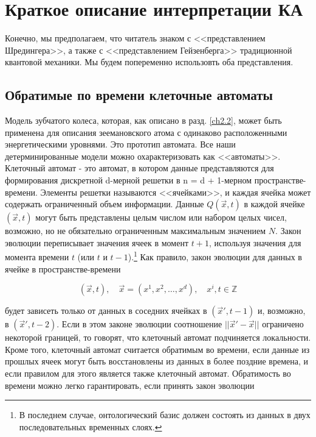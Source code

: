 \documentclass[main.tex]{subfiles}
\begin{document}
\section{Краткое описание интерпретации КА}\label{ch5}

Конечно, мы предполагаем, что читатель знаком с <<представлением Шредингера>>, а также с <<представлением Гейзенберга>> традиционной квантовой механики. Мы будем попеременно использовть оба представления.

\subsection{Обратимые по времени клеточные автоматы }\label{ch5.1}

Модель зубчатого колеса, которая, как описано в разд. \ref{ch2.2}, может быть применена для описания зеемановского атома с одинаково расположенными энергетическими уровнями. Это прототип автомата. Все наши детерминированные модели можно охарактеризовать как <<автоматы>>. Клеточный автомат - это автомат, в котором данные представляются для формирования дискретной d-мерной решетки в n = d + 1-мерном пространстве-времени. Элементы решетки называются <<ячейками>>, и каждая ячейка может содержать ограниченный объем информации. Данные $Q (\vec x, t)$ в каждой ячейке $(\vec x, t)$ могут быть представлены целым числом или набором целых чисел, возможно, но не обязательно ограниченным максимальным значением $N$. Закон эволюции переписывает значения ячеек в момент $t + 1$, используя значения для момента времени $t$ (или $t$ и $t-1$).\footnote{В последнем случае, онтологический базис должен состоять из данных в двух последовательных временных слоях.} Как правило, закон эволюции для данных в ячейке в пространстве-времени

\begin{equation}\label{5.1}
	(\vec{x}, t), \quad \vec{x}=\left(x^{1}, x^{2}, \ldots, x^{d}\right), \quad x^{i}, t \in \mathbb{Z}
\end{equation}
         
будет зависеть только от данных в соседних ячейках в $(\vec x', t-1)$ и, возможно, в $(\vec x', t-2)$. Если в этом законе эволюции соотношение $|| \vec x '- \vec x ||$ ограничено некоторой границей, то говорят, что клеточный автомат подчиняется локальности.
Кроме того, клеточный автомат считается обратимым во времени, если данные из прошлых ячеек могут быть восстановлены из данных в более поздние времена, и если правилом для этого является также клеточный автомат. Обратимость во времени можно легко гарантировать, если принять закон эволюции
\end{document}
